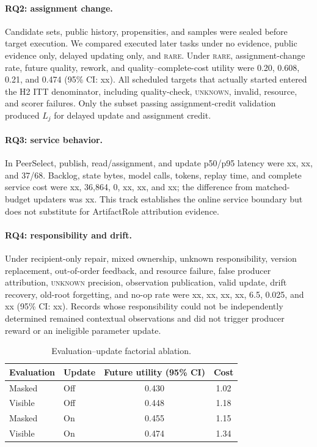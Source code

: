 \documentclass[sigconf,anonymous]{aamas}
\newcommand{\rare}{\textsc{rare}}
\newcommand{\unknown}{\textsc{unknown}}
\begin{document}
\paragraph{RQ2: assignment change.} Candidate sets, public history, propensities, and samples were sealed before target execution. We compared executed later tasks under no evidence, public evidence only, delayed updating only, and \rare{}. Under \rare{}, assignment-change rate, future quality, rework, and quality--complete-cost utility were 0.20, 0.608, 0.21, and 0.474 (95\% CI: xx). All scheduled targets that actually started entered the H2 ITT denominator, including quality-check, \unknown{}, invalid, resource, and scorer failures. Only the subset passing assignment-credit validation produced $L_j$ for delayed update and assignment credit.

\paragraph{RQ3: service behavior.} In PeerSelect, publish, read/assignment, and update p50/p95 latency were xx, xx, and 37/68. Backlog, state bytes, model calls, tokens, replay time, and complete service cost were xx, 36,864, 0, xx, xx, and xx; the difference from matched-budget updaters was xx. This track establishes the online service boundary but does not substitute for ArtifactRole attribution evidence.

\paragraph{RQ4: responsibility and drift.} Under recipient-only repair, mixed ownership, unknown responsibility, version replacement, out-of-order feedback, and resource failure, false producer attribution, \unknown{} precision, observation publication, valid update, drift recovery, old-root forgetting, and no-op rate were xx, xx, xx, xx, 6.5, 0.025, and xx (95\% CI: xx). Records whose responsibility could not be independently determined remained contextual observations and did not trigger producer reward or an ineligible parameter update.

\begin{table}[t]
\centering\small
\setlength{\tabcolsep}{3pt}
\begin{tabular}{llcc}
\toprule
Evaluation & Update & Future utility (95\% CI) & Cost \\
\midrule
Masked & Off & 0.430 & 1.02 \\
Visible & Off & 0.448 & 1.18 \\
Masked & On & 0.455 & 1.15 \\
Visible & On & 0.474 & 1.34 \\
\bottomrule
\end{tabular}
\caption{Evaluation--update factorial ablation.}
\label{tab:factorial-results}
\end{table}
\end{document}
